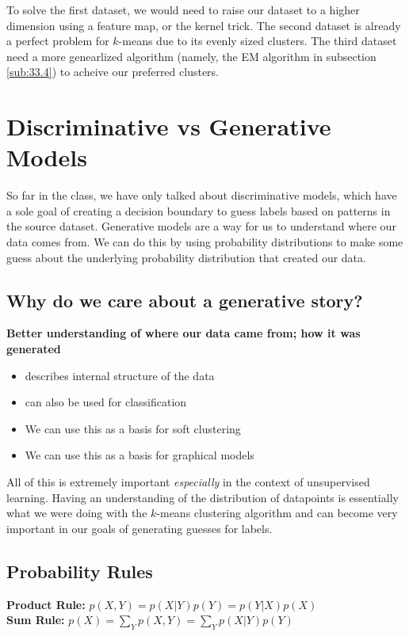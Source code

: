 \documentclass[12pt]{article}
\begin{document}
To solve the first dataset, we would need to raise our dataset to a higher dimension using a feature map, or the kernel trick. The second dataset is already a perfect problem for $k$-means due to its evenly sized clusters. The third dataset need a more genearlized algorithm (namely, the EM algorithm in subsection \ref{sub:33.4}) to acheive our preferred clusters.

\section{Discriminative vs Generative Models}

So far in the class, we have only talked about discriminative models, which have a sole goal of creating a decision boundary to guess labels based on patterns in the source dataset. Generative models are a way for us to understand where our data comes from. We can do this by using probability distributions to make some guess about the underlying probability distribution that created our data. 

\subsection{Why do we care about a generative story?}

\textbf{Better understanding of where our data came from; how it was generated}

\begin{itemize}
	\item describes internal structure of the data
	\item can also be used for classification
	\item We can use this as a basis for soft clustering
	\item We can use this as a basis for graphical models
\end{itemize}

All of this is extremely important \emph{especially} in the context of unsupervised learning. Having an understanding of the distribution of datapoints is essentially what we were doing with the $k$-means clustering algorithm and can become very important in our goals of generating guesses for labels.

\subsection{Probability Rules}

\textbf{Product Rule:} $p(X,Y) = p(X | Y) p(Y) = p(Y | X) p(X)$\\
\textbf{Sum Rule:} $p(X) = \sum_Y p(X,Y) = \sum_Y p(X|Y)p(Y)$
\end{document}
